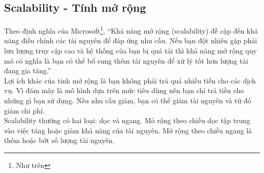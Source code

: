 \subsection{Scalability - Tính mở rộng}
\noindent Theo định nghĩa của Microsoft\footnote{Như trên}, “Khả năng mở rộng (scalability) đề cập đến khả năng điều chỉnh các tài nguyên để đáp ứng nhu cầu. Nếu bạn đột nhiên gặp phải lưu lượng truy cập cao và hệ thống của bạn bị quá tải thì khả năng mở rộng quy mô có nghĩa là bạn có thể bổ sung thêm tài nguyên để xử lý tốt hơn lượng tải đang gia tăng.” \\[0.5cm]
\noindent Lợi ích khác của tính mở rộng là bạn không phải trả quá nhiều tiền cho các dịch vụ. Vì đám mây là mô hình dựa trên mức tiêu dùng nên bạn chỉ trả tiền cho những gì bạn sử dụng. Nếu nhu cầu giảm, bạn có thể giảm tài nguyên và từ đó giảm chi phí. \\[0.5cm]
\noindent Scalability thường có hai loại: dọc và ngang. Mỏ rộng theo chiều dọc tập trung vào việc tăng hoặc giảm khả năng của tài nguyên. Mở rộng theo chiều ngang là thêm hoặc bớt số lượng tài nguyên.

